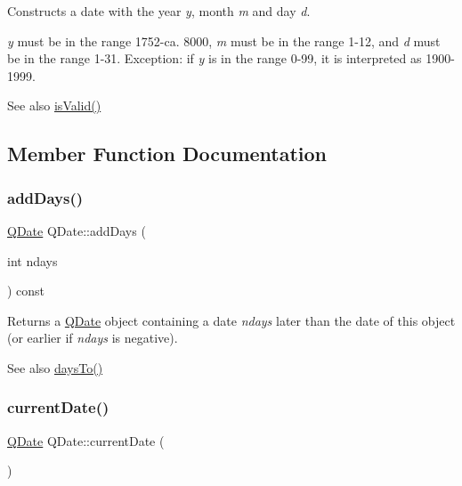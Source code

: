 Constructs a date with the year {\itshape y}, month {\itshape m} and day {\itshape d}.

{\itshape y} must be in the range 1752-\/ca. 8000, {\itshape m} must be in the range 1-\/12, and {\itshape d} must be in the range 1-\/31. Exception\+: if {\itshape y} is in the range 0-\/99, it is interpreted as 1900-\/1999.

\begin{DoxySeeAlso}{See also}
\mbox{\hyperlink{class_q_date_a29baa5808185ed5a3ed5a0440e27ca9c}{is\+Valid()}} 
\end{DoxySeeAlso}


\subsection{Member Function Documentation}
\mbox{\label{class_q_date_aea0944d5825cb73f4bdad70577ba9a31}} 
\subsubsection{\texorpdfstring{addDays()}{addDays()}}
{\footnotesize\ttfamily \mbox{\hyperlink{class_q_date}{Q\+Date}} Q\+Date\+::add\+Days (\begin{DoxyParamCaption}\item[{int}]{ndays }\end{DoxyParamCaption}) const}

Returns a \mbox{\hyperlink{class_q_date}{Q\+Date}} object containing a date {\itshape ndays} later than the date of this object (or earlier if {\itshape ndays} is negative).

\begin{DoxySeeAlso}{See also}
\mbox{\hyperlink{class_q_date_a4089a34058a747a78a1f5f3b3ea4ad0d}{days\+To()}} 
\end{DoxySeeAlso}
\mbox{\label{class_q_date_a7112e1452f46e40cf349f2e769887e1c}} 
\subsubsection{\texorpdfstring{currentDate()}{currentDate()}}
{\footnotesize\ttfamily \mbox{\hyperlink{class_q_date}{Q\+Date}} Q\+Date\+::current\+Date (\begin{DoxyParamCaption}{ }\end{DoxyParamCaption})\hspace{0.3cm}{\ttfamily [static]}}

